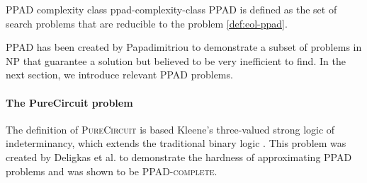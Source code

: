 \begin{definitionbox}{\textsc{PPAD} complexity class \cite{papadimitriou_ComplexityParityArgument_1994}}{ppad-complexity-class}
    \textsc{PPAD} is defined as the set of search problems that
    are reducible to the  problem \ref{def:eol-ppad}.
\end{definitionbox}

\textsc{PPAD} has been created by Papadimitriou \cite{papadimitriou_ComplexityParityArgument_1994}
to demonstrate a subset of problems in \textsc{NP} that guarantee
a solution but believed to be very inefficient to find.
In the next section,
we introduce relevant \textsc{PPAD} problems.

\paragraph{The PureCircuit problem}
\label{par:pure-circ-def}

The definition of \textsc{PureCircuit} is based Kleene's three-valued strong logic of indeterminancy,
which extends the traditional binary logic \cite{kleene_IntroductionMetamathematics_2009}.
This problem was created by Deligkas et al. \cite{deligkas_PureCircuitTightInapproximability_2024}
to demonstrate the hardness of approximating \textsc{PPAD} problems and was shown to be \textsc{PPAD-complete}.


